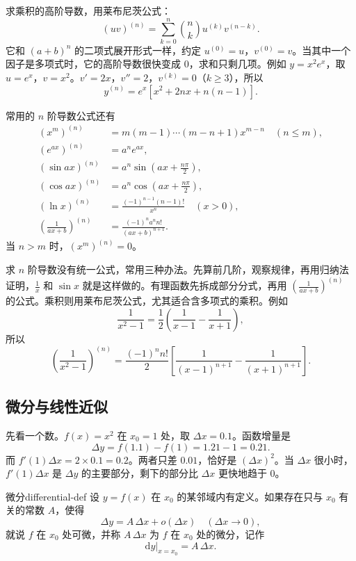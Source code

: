 求乘积的高阶导数，用莱布尼茨公式：
\[
(uv)^{(n)}=\sum_{k=0}^{n}\binom{n}{k}u^{(k)}v^{(n-k)}.
\]
它和 $(a+b)^n$ 的二项式展开形式一样，约定 $u^{(0)}=u$，$v^{(0)}=v$。当其中一个因子是多项式时，它的高阶导数很快变成 $0$，求和只剩几项。例如 $y=x^2e^x$，取 $u=e^x$，$v=x^2$。$v'=2x$，$v''=2$，$v^{(k)}=0$（$k\ge3$），所以
\[
y^{(n)}=e^x\left[x^2+2nx+n(n-1)\right].
\]

常用的 $n$ 阶导数公式还有
\[
\begin{aligned}
(x^m)^{(n)}&=m(m-1)\cdots(m-n+1)x^{m-n}\quad(n\le m),\\
(e^{ax})^{(n)}&=a^ne^{ax},\\
(\sin ax)^{(n)}&=a^n\sin\left(ax+\frac{n\pi}{2}\right),\\
(\cos ax)^{(n)}&=a^n\cos\left(ax+\frac{n\pi}{2}\right),\\
(\ln x)^{(n)}&=\frac{(-1)^{n-1}(n-1)!}{x^n}\quad(x>0),\\
\left(\frac{1}{ax+b}\right)^{(n)}&=\frac{(-1)^n a^n n!}{(ax+b)^{n+1}}.
\end{aligned}
\]
当 $n>m$ 时，$(x^m)^{(n)}=0$。

求 $n$ 阶导数没有统一公式，常用三种办法。先算前几阶，观察规律，再用归纳法证明，$\frac1x$ 和 $\sin x$ 就是这样做的。有理函数先拆成部分分式，再用 $\left(\frac{1}{ax+b}\right)^{(n)}$ 的公式。乘积则用莱布尼茨公式，尤其适合含多项式的乘积。例如
\[
\frac{1}{x^2-1}=\frac12\left(\frac{1}{x-1}-\frac{1}{x+1}\right),
\]
所以
\[
\left(\frac{1}{x^2-1}\right)^{(n)}
=\frac{(-1)^n n!}{2}\left[\frac{1}{(x-1)^{n+1}}-\frac{1}{(x+1)^{n+1}}\right].
\]

\subsection{微分与线性近似}

先看一个数。$f(x)=x^2$ 在 $x_0=1$ 处，取 $\Delta x=0.1$。函数增量是
\[
\Delta y=f(1.1)-f(1)=1.21-1=0.21.
\]
而 $f'(1)\Delta x=2\times0.1=0.2$。两者只差 $0.01$，恰好是 $(\Delta x)^2$。当 $\Delta x$ 很小时，$f'(1)\Delta x$ 是 $\Delta y$ 的主要部分，剩下的部分比 $\Delta x$ 更快地趋于 $0$。

\begin{mydef}{微分}{differential-def}
设 $y=f(x)$ 在 $x_0$ 的某邻域内有定义。如果存在只与 $x_0$ 有关的常数 $A$，使得
\[
\Delta y=A\,\Delta x+o(\Delta x)\quad(\Delta x\to0),
\]
就说 $f$ 在 $x_0$ 处可微，并称 $A\,\Delta x$ 为 $f$ 在 $x_0$ 处的微分，记作
\[
\left.\mathrm{d}y\right|_{x=x_0}=A\,\Delta x.
\]
\end{mydef}

